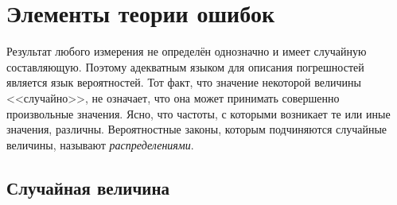 \chapter{Элементы теории ошибок}
\label{ch:prob}



Результат любого измерения не определён однозначно и имеет случайную составляющую.
Поэтому адекватным языком для описания погрешностей является язык вероятностей.
Тот факт, что значение некоторой величины <<случайно>>, не означает, что
она может принимать совершенно произвольные значения. Ясно, что частоты, с которыми
возникает те или иные значения, различны. Вероятностные законы, которым
подчиняются случайные величины, называют \emph{распределениями}.

\section{Случайная величина}



